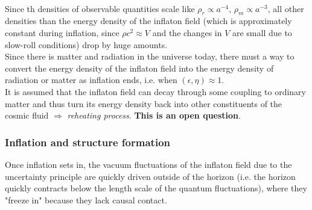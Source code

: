 \\
Since th densities of observable quantities scale like $\rho_r \propto a^{-4}$, $\rho_m \propto a^{-3}$, all other densities than the energy density of the inflaton field (which is approximately constant during inflation, since $\rho c^2 \approx V$ and the changes in $V$ are small due to slow-roll conditions) drop by huge amounts.\\
 Since there is matter and radiation in the universe today, there must a way to convert the energy density of the inflaton field into the energy density of radiation or matter as inflation ends, i.e. when $(\epsilon,\eta)\approx 1$.\\
 It is assumed that the inflaton field can decay through some coupling to ordinary matter and thus turn its energy density back into other constituents of the cosmic fluid $\Rightarrow$ \emph{reheating process}. \textbf{This is an open question}.

\subsubsection{Inflation and structure formation}
Once inflation sets in, the vacuum fluctuations of the inflaton field due to the uncertainty principle are quickly driven outside of the horizon (i.e. the horizon quickly contracts below the length scale of the quantum fluctuations), where they "freeze in" because they lack causal contact.\\
